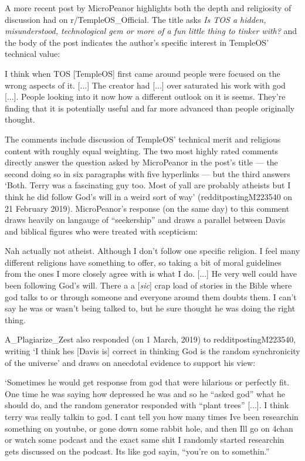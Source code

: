 \documentclass[Draft.tex]{subfiles}
\begin{document}
A more recent post by MicroPeanor \parencite*{MicroPeanor19} highlights
both the depth and religiosity of discussion had on r/TempleOS\_Official.
The title asks
\textit{Is TOS a hidden, misunderstood, technological gem
or more of a fun little thing to tinker with?}
and the body of the post indicates the author's specific interest in
TempleOS' technical value:
\begin{displayquote}
	I think when TOS [TempleOS] first came around people were focused
	on the wrong aspects of it.  [...]
	The creator had [...] over saturated his work with god [...].
	People looking into it now how a different outlook on it is seems.
	They’re finding that it is potentially useful and far more advanced
	than people originally thought.
\end{displayquote}
The comments include discussion of TempleOS' technical merit and religious
content with roughly equal weighting.
The two most highly rated comments directly answer the question asked by
MicroPeanor in the post's title --- the second doing so in six paragraphs
with five hyperlinks --- but the third answers
`Both. Terry was a fascinating guy too.
Most of yall are probably atheists but I think
he did follow God's will in a weird sort of way'
(redditpostingM223540 on 21 February 2019).
MicroPeanor's response (on the same day) to this comment
draws heavily on langauge of ``seekership'' and draws a parallel between
Davis and biblical figures who were treated with scepticism:
\begin{displayquote}
	Nah actually not atheist. Although I don’t follow one specific religion.
	I feel many different religions have something to offer,
	so taking a bit of moral guidelines from the ones I more closely agree with
	is what I do.  [...]
	He very well could have been following God’s will.
	There a a [\textit{sic}] crap load of stories in the Bible
	where god talks to or through someone and everyone around them doubts them.
	I can’t say he was or wasn’t being talked to,
	but he sure thought he was doing the right thing.
\end{displayquote}
A\_Plagiarize\_Zest also responded (on 1 March, 2019) to redditpostingM223540,
writing `I think hes [Davis is] correct in thinking God
is the random synchronicity of the universe' and draws on anecdotal evidence
to support his view:
\begin{displayquote}
	`Sometimes he would get response from god that were hilarious or perfectly fit.
	One time he was saying how depressed he was and so he ``asked god''
	what he should do, and the random generator responded
	with ``plant trees'' [...].
	I think terry was really talkin to god. I cant tell you how many times
	Ive been researchin something on youtube, or gone down some rabbit hole,
	and then Ill go on 4chan or watch some podcast and the exact same shit
	I randomly started researchin gets discussed on the podcast.
	Its like god sayin, ``you're on to somethin.''
\end{displayquote}
\end{document}
